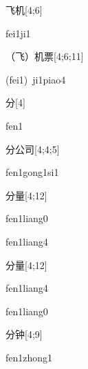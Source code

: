 \begin{verbete}[fei1ji1]{飞机}[4;6]
\begin{pronuncia}{fei1ji1}
\end{pronuncia}
\end{verbete}

\begin{verbete}{（飞）机票}[4;6;11]
\begin{pronuncia}[\\]{(fei1)\ ji1piao4}
\end{pronuncia}
\end{verbete}

\begin{verbete}[fen1]{分}[4]
\begin{pronuncia}{fen1}
\end{pronuncia}
\end{verbete}

\begin{verbete}{分公司}[4;4;5]
\begin{pronuncia}{fen1gong1si1}
\end{pronuncia}
\end{verbete}

\begin{verbete}{分量}[4;12]
\begin{pronuncia}{fen1liang0}
\end{pronuncia}
\begin{pronuncia}{fen1liang4}
\end{pronuncia}
\end{verbete}

\begin{verbete}{分量}[4;12]
\begin{pronuncia}{fen1liang4}
\end{pronuncia}
\begin{pronuncia}{fen1liang0}
\end{pronuncia}
\end{verbete}

\begin{verbete}{分钟}[4;9]
\begin{pronuncia}{fen1zhong1}
\end{pronuncia}
\end{verbete}


